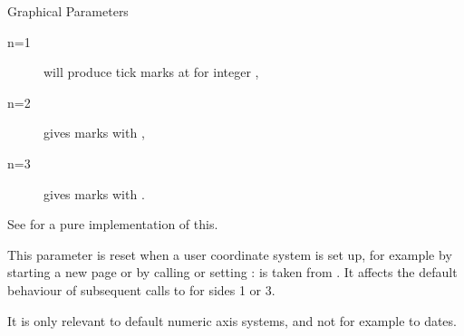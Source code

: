 \begin{Section}{Graphical Parameters}
\begin{description}
\begin{description}

\item[n=1] will produce tick marks at  for integer ,
\item[n=2] gives marks   with
,
\item[n=3] gives marks   with
.

\end{description}

See  for a pure \R{} implementation of this.

This parameter is reset when a user coordinate system is set up,
for example by starting a new page or by calling
 or setting : 
is taken from .  It affects the default behaviour
of subsequent calls to  for sides 1 or 3.

It is only relevant to default numeric axis systems, and not for
example to dates.


\end{description}
\end{Section}
